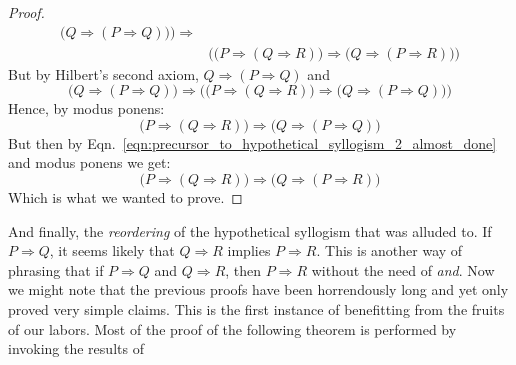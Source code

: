 \begin{proof}
\begin{equation}
\begin{split}
                    \big(
                        Q\Rightarrow(P\Rightarrow{Q})
                    \big)
                \Big)
                \Rightarrow\\
                &\Big(
                    \big(
                        P\Rightarrow(Q\Rightarrow{R})
                    \big)
                    \Rightarrow
                    \big(
                        Q\Rightarrow(P\Rightarrow{R})
                    \big)
                \Big)
            \end{split}
        \end{equation}
        But by Hilbert's second axiom, $Q\Rightarrow(P\Rightarrow{Q})$ and
        \begin{equation}
            \big(Q\Rightarrow(P\Rightarrow{Q})\big)
            \Rightarrow
            \Big(
                \big(
                    P\Rightarrow(Q\Rightarrow{R})
                \big)\Rightarrow
                \big(
                    Q\Rightarrow(P\Rightarrow{Q})
                \big)
            \Big)
        \end{equation}
        Hence, by modus ponens:
        \begin{equation}
            \big(
                P\Rightarrow(Q\Rightarrow{R})
            \big)\Rightarrow
            \big(
                Q\Rightarrow(P\Rightarrow{Q})
            \big)
        \end{equation}
        But then by
        Eqn.~\ref{eqn:precursor_to_hypothetical_syllogism_2_almost_done} and
        modus ponens we get:
        \begin{equation}
            \big(
                P\Rightarrow(Q\Rightarrow{R})
            \big)
            \Rightarrow
            \big(
                Q\Rightarrow(P\Rightarrow{R})
            \big)
        \end{equation}
        Which is what we wanted to prove.
    \end{proof}
    And finally, the \textit{reordering} of the hypothetical syllogism that was
    alluded to. If $P\Rightarrow{Q}$, it seems likely that
    $Q\Rightarrow{R}$ implies $P\Rightarrow{R}$. This is another way of phrasing
    that if $P\Rightarrow{Q}$ and $Q\Rightarrow{R}$, then $P\Rightarrow{R}$
    without the need of \textit{and}. Now we might note that the previous proofs
    have been horrendously long and yet only proved very simple claims. This is
    the first instance of benefitting from the fruits of our labors. Most of the
    proof of the following theorem is performed by invoking the results of
